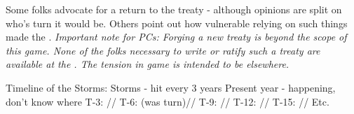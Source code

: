 \documentclass[blue]{GL2020}
\begin{document}
Some folks advocate for a return to the treaty - although opinions are split on who's turn it would be. Others point out how vulnerable relying on such things made the \pShip{}. \emph{Important note for PCs: Forging a new treaty is beyond the scope of this game. None of the folks necessary to write or ratify such a treaty are available at the \pSchool{}. The tension in game is intended to be elsewhere.}

Timeline of the Storms:
Storms - hit every 3 years
Present year - happening, don’t know where
T-3: \pShip{}//
T-6: \pShip{} (was \pTech{} turn)//
T-9: \pFarm{}//
T-12: \pShip{}//
T-15: \pTech{}//
Etc.
\end{document}
